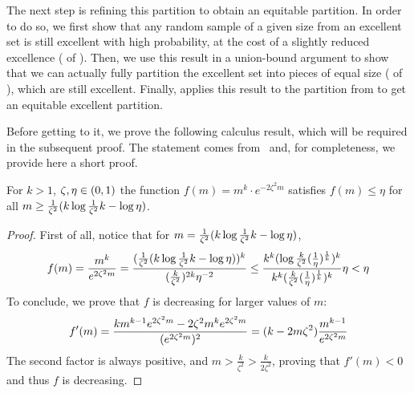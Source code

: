         The next step is refining this partition to obtain an equitable partition.
        In order to do so, we first show that any random sample of a given size from an excellent set is still excellent
        with high probability, at the cost of a slightly reduced excellence ( of
        ).
        Then, we use this result in a union-bound argument to show that we can actually fully partition the excellent set into
        pieces of equal size ( of
        ), which are still excellent.
        Finally,  applies this result to the partition from
         to get an equitable excellent partition.

        Before getting to it, we prove the following calculus result, which will be required in the subsequent proof.
        The statement comes from~\cite{no_me_acuerdo} and, for completeness, we provide here a short proof.

        \begin{lemma} \label{lem:ineq_5.13}
            For $k > 1$, $\zeta, \eta \in ( 0,1 )$ the function $f(m) = m^k \cdot e^{-2 \zeta^2 m}$ satisfies
            $f(m) \leq \eta$ for all $m \geq \frac{1}{\zeta^2}( k \log{\frac{1}{\zeta^2} k} - \log{\eta} )$.
            \begin{proof}
                First of all, notice that for $m = \frac{1}{\zeta^2}( k \log{\frac{1}{\zeta^2} k} - \log{\eta} )$,
                \[
                    f(m) = \frac{m^k}{e^{2 \zeta^2 m}}
                         = \frac{( \frac{1}{\zeta^2}( k \log{\frac{1}{\zeta^2} k} - \log{\eta} ) )^k}{
                            ( \frac{k}{\zeta^2} )^{2k} \eta^{-2}}
                         \leq \frac{k^k ( \log{\frac{k}{\zeta^2}( \frac{1}{\eta} )^{\frac{1}{k}}} )^k}
                            {k^k ( \frac{k}{\zeta^2} ( \frac{1}{\eta} )^{\frac{1}{k}} )^k} \eta
                         < \eta
                \]
                To conclude, we prove that $f$ is decreasing for larger values of $m$:
                \[
                    f'(m)
                        = \frac{k m^{k-1} e^{2 \zeta^2 m} - 2 \zeta^2 m^k e^{2 \zeta^2 m}}{( e^{2 \zeta^2 m} )^2}
                        = ( k - 2m\zeta^2 ) \frac{m^{k-1}}{e^{2 \zeta^2 m}}
                \]
                The second factor is always positive, and $m > \frac{k}{\zeta^2} > \frac{k}{2\zeta^2}$, proving that $f'(m) < 0$
                and thus $f$ is decreasing.
            \end{proof}
        \end{lemma}

